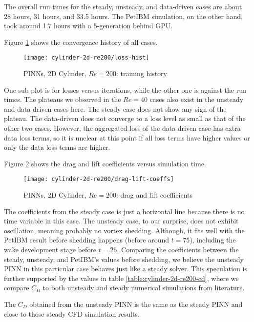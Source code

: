 The overall run times for the steady, unsteady, and data-driven cases are about 28 hours, 31 hours, and 33.5 hours.
The PetIBM simulation, on the other hand, took around 1.7 hours with a 5-generation behind GPU.

Figure \ref{fig:cylinder-re200-train-hist} shows the convergence history of all cases.
\begin{figure}[hbt!]
    \texttt{[image: cylinder-2d-re200/loss-hist]}
    \caption{PINNs, 2D Cylinder, $Re=200$: training history}
    \label{fig:cylinder-re200-train-hist}
\end{figure}
One sub-plot is for losses versus iterations, while the other one is against the run times.
The plateaus we observed in the $Re=40$ cases also exist in the unsteady and data-driven cases here.
The steady case does not show any sign of the plateau.
The data-driven does not converge to a loss level as small as that of the other two cases.
However, the aggregated loss of the data-driven case has extra data loss terms, so it is unclear at this point if all loss terms have higher values or only the data loss terms are higher. 

Figure \ref{fig:cylinder-re200-drag-lift} shows the drag and lift coefficients versus simulation time.
\begin{figure}[hbt!]
    \texttt{[image: cylinder-2d-re200/drag-lift-coeffs]}
    \caption{PINNs, 2D Cylinder, $Re=200$: drag and lift coefficients}
    \label{fig:cylinder-re200-drag-lift}
\end{figure}
The coefficients from the steady case is just a horizontal line because there is no time variable in this case.
The unsteady case, to our surprise, does not exhibit oscillation, meaning probably no vortex shedding.
Although, it fits well with the PetIBM result before shedding happens (before around $t=75$), including the wake development stage before $t=25$.
Comparing the coefficients between the steady, unsteady, and PetIBM's values before shedding, we believe the unsteady PINN in this particular case behaves just like a steady solver.
This speculation is further supported by the values in table \ref{table:cylinder-2d-re200-cd}, where we compare $C_D$ to both unsteady and steady numerical simulations from literature.

The $C_D$ obtained from the unsteady PINN is the same as the steady PINN and close to those steady CFD simulation results.

